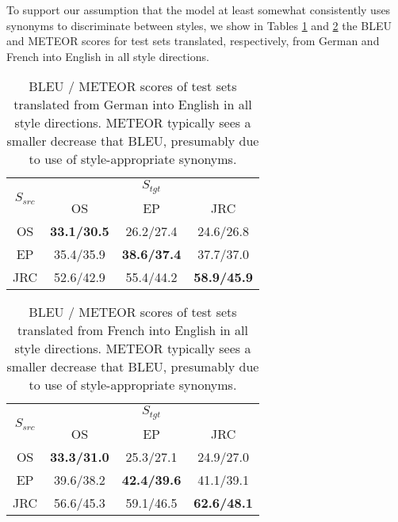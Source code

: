 \documentclass[11pt,a4paper]{article}
\begin{document}
 To support our assumption that the model at least somewhat consistently uses synonyms to discriminate between styles, we show in Tables \ref{tab-deenbleumet} and \ref{tab-frenbleumet} the BLEU and METEOR scores for test sets translated, respectively, from German and French into English in all style directions.


\begin{table}[]
\centering
\begin{tabular}{|c|c|c|c|}
\hline
\multirow{2}{*}{$S_{src}$} & \multicolumn{3}{c|}{$S_{tgt}$}                                  \\ \cline{2-4} 
                              & OS                   & EP                   & JRC                  \\ \hline
OS                            & \textbf{33.1/30.5} & 26.2/27.4          & 24.6/26.8          \\ \hline
EP                            & 35.4/35.9          & \textbf{38.6/37.4} & 37.7/37.0          \\ \hline
JRC                           & 52.6/42.9          & 55.4/44.2          & \textbf{58.9/45.9} \\ \hline
\end{tabular}
\caption{\small BLEU / METEOR scores of test sets translated from German into English in all style directions. METEOR typically sees a smaller decrease that BLEU, presumably due to use of style-appropriate synonyms.
      }
\label{tab-deenbleumet}
\end{table}

\begin{table}[]
\centering
\begin{tabular}{|c|c|c|c|}
\hline
\multirow{2}{*}{$S_{src}$} & \multicolumn{3}{c|}{$S_{tgt}$}                                  \\ \cline{2-4} 
                              & OS                   & EP                   & JRC                  \\ \hline
OS                            & \textbf{33.3/31.0} & 25.3/27.1          & 24.9/27.0          \\ \hline
EP                            & 39.6/38.2          & \textbf{42.4/39.6} & 41.1/39.1          \\ \hline
JRC                           & 56.6/45.3          & 59.1/46.5          & \textbf{62.6/48.1} \\ \hline
\end{tabular}
\caption{\small BLEU / METEOR scores of test sets translated from French into English in all style directions. METEOR typically sees a smaller decrease that BLEU, presumably due to use of style-appropriate synonyms.
      }
\label{tab-frenbleumet}
\end{table}
\end{document}
